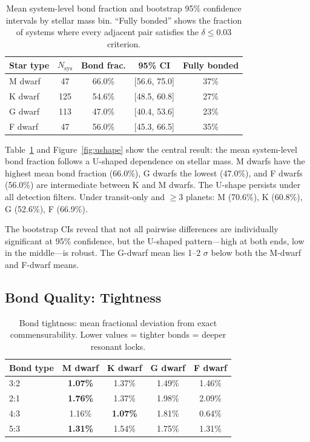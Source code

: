 \documentclass[twocolumn]{aastex631}
\begin{document}
\begin{table}
\centering
\caption{Mean system-level bond fraction and bootstrap 95\% confidence
intervals by stellar mass bin. ``Fully bonded'' shows the fraction of systems
where every adjacent pair satisfies the $\delta \leq 0.03$ criterion.}
\begin{tabular}{lcccc}
\hline
Star type & $N_{\text{sys}}$ & Bond frac. & 95\% CI & Fully bonded \\
\hline
M dwarf    & 47  & 66.0\% & [56.6, 75.0] & 37\% \\
K dwarf    & 125 & 54.6\% & [48.5, 60.8] & 27\% \\
G dwarf    & 113 & 47.0\% & [40.4, 53.6] & 23\% \\
F dwarf    & 47  & 56.0\% & [45.3, 66.5] & 35\% \\
\hline
\end{tabular}
\label{tab:ushape}
\end{table}

Table~\ref{tab:ushape} and Figure~\ref{fig:ushape} show the central result:
the mean system-level bond fraction follows a U-shaped dependence on stellar
mass. M dwarfs have the highest mean bond fraction (66.0\%), G dwarfs the
lowest (47.0\%), and F dwarfs (56.0\%) are intermediate between K and M
dwarfs. The U-shape persists under all detection filters. Under transit-only
and $\geq 3$ planets: M (70.6\%), K (60.8\%), G (52.6\%), F (66.9\%).

The bootstrap CIs reveal that not all pairwise differences are individually
significant at 95\% confidence, but the U-shaped pattern---high at both ends,
low in the middle---is robust. The G-dwarf mean lies 1--2 $\sigma$ below both
the M-dwarf and F-dwarf means.

\subsection{Bond Quality: Tightness}

\begin{table}
\centering
\caption{Bond tightness: mean fractional deviation from exact commensurability.
Lower values = tighter bonds = deeper resonant locks.}
\begin{tabular}{lcccc}
\hline
Bond type & M dwarf & K dwarf & G dwarf & F dwarf \\
\hline
3:2        & \textbf{1.07\%} & 1.37\% & 1.49\% & 1.46\% \\
2:1        & \textbf{1.76\%} & 1.37\% & 1.98\% & 2.09\% \\
4:3        & 1.16\% & \textbf{1.07\%} & 1.81\% & 0.64\% \\
5:3        & \textbf{1.31\%} & 1.54\% & 1.75\% & 1.31\% \\
\hline
\end{tabular}
\label{tab:tightness}
\end{table}
\end{document}
